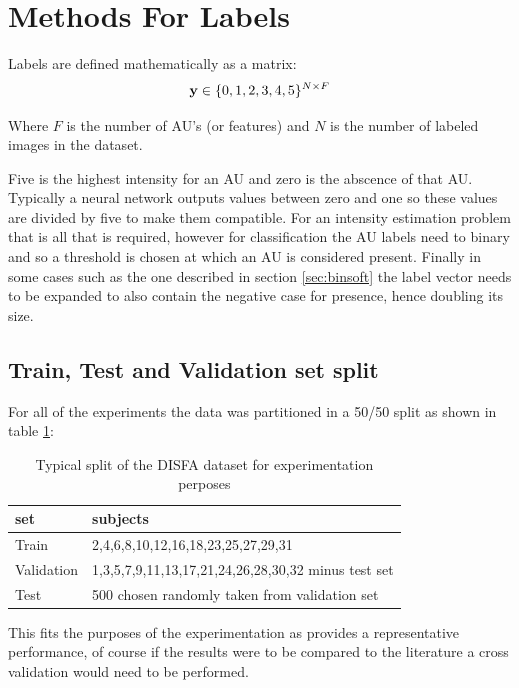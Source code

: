     \section{Methods For Labels}

      Labels are defined mathematically as a matrix:
      \begin{equation}
        {\bf y} \in \{0,1,2,3,4,5\}^{N\times F}
      \end{equation}

      Where $F$ is the number of AU's (or features) and $N$ is the number of labeled images
      in the dataset.

      Five is the highest intensity for an AU and zero is the abscence of that AU.
      Typically a neural network outputs values between zero and one so these values are divided by five to make them compatible.
      For an intensity estimation problem that is all that is required, however for classification
      the AU labels need to binary and so a threshold is chosen at which an AU is considered present.
      Finally in some cases such as the one described in section \ref{sec:binsoft} the label vector
      needs to be expanded to also contain the negative case for presence, hence doubling its size.

      \subsection{Train, Test and Validation set split}
        For all of the experiments the data was partitioned in a 50/50 split as shown in table \ref{sec:splitting}:
        \begin{table}[h!]
          \centering
          \begin{tabular}{|l|l|}
          \hline
          set & subjects   \\
          \hline
           Train          & 2,4,6,8,10,12,16,18,23,25,27,29,31      \\
          \hline
          Validation      & 1,3,5,7,9,11,13,17,21,24,26,28,30,32 minus test set     \\
          \hline
          Test           & 500 chosen randomly taken from validation set      \\
         \hline
          \end{tabular}
          \caption{Typical split of the DISFA dataset for experimentation perposes}
          \label{sec:splitting}
        \end{table}

        This fits the purposes of the experimentation as provides a representative performance, of course
        if the results were to be compared to the literature a cross validation would need to be performed.


